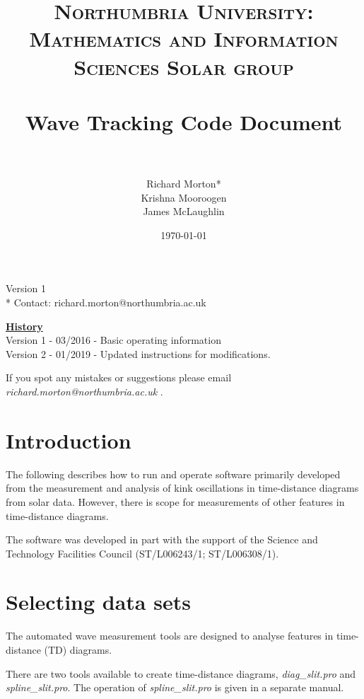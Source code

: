 \documentclass{article}
\title{	
\normalfont \normalsize 
\textsc{Northumbria University: Mathematics and Information Sciences Solar group} \\ [25pt] %
\horrule{0.5pt} \\[0.4cm] %
\huge Wave Tracking Code Document \\ %
\horrule{2pt} \\[0.5cm] %
}
\author{Richard Morton*\\ Krishna Mooroogen\\ James McLaughlin} %
\date{\normalsize\today} %
\begin{document}
\maketitle %

\vspace{10cm}

\begin{center}
{Version 1}\\
* Contact: richard.morton@northumbria.ac.uk 
\end{center}

\newpage
\underline{\textbf{History}}\\

Version 1 - 03/2016 - Basic operating information\\
Version 2 - 01/2019 - Updated instructions for modifications.

\vspace{2cm}

If you spot any mistakes or suggestions please email \textit{richard.morton@northumbria.ac.uk} .

\newpage
\section{Introduction}
The following describes how to run and operate software primarily developed from the measurement and analysis of kink oscillations in time-distance diagrams from solar data. However, there is scope for measurements of other features in time-distance diagrams. 

\medskip
The software was developed in part with the support of the Science and Technology Facilities Council (ST/L006243/1; ST/L006308/1).



\section{Selecting data sets}
The automated wave measurement tools are designed to analyse features in time-distance (TD) diagrams.

There are two tools available to create time-distance diagrams, \textit{diag\_slit.pro} and \textit{spline\_slit.pro}. The operation of \textit{spline\_slit.pro} is given in a separate manual.
\end{document}
